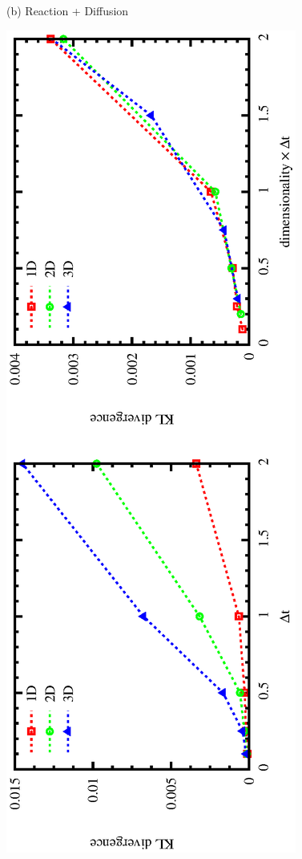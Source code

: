 \documentclass{article}
\begin{document}
\begin{figure}
\begin{center}
(b) Reaction + Diffusion
\vspace{-5mm}
\end{center}
\includegraphics[angle=270,width=\linewidth]{fig1/KLdiv_react.eps}
\caption{\label{fig_KLdiv}}
\end{figure}
\end{document}
